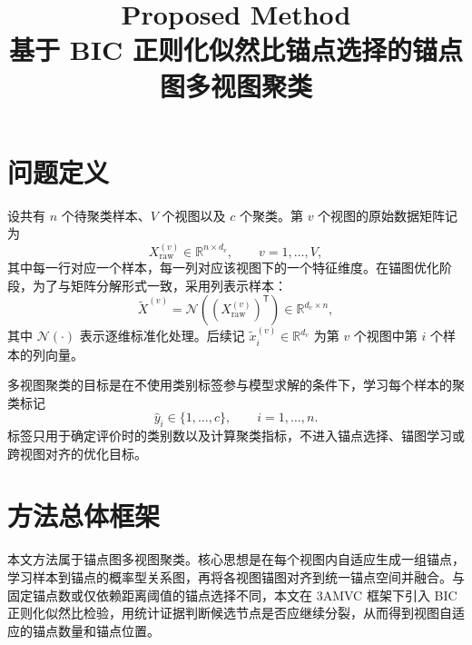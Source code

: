 \documentclass[UTF8,a4paper,12pt,fontset=none]{ctexart}
\title{\textbf{Proposed Method}\\
\large 基于 BIC 正则化似然比锚点选择的锚点图多视图聚类}
\author{}
\date{}
\newcommand{\R}{\mathbb{R}}
\newcommand{\T}{\mathsf{T}}
\begin{document}
\maketitle
\tableofcontents
\newpage

\section{问题定义}

设共有 \(n\) 个待聚类样本、\(V\) 个视图以及 \(c\) 个聚类。第 \(v\) 个视图的原始数据矩阵记为
\begin{equation}
X_{\mathrm{raw}}^{(v)}\in\R^{n\times d_v},\qquad v=1,\ldots,V,
\end{equation}
其中每一行对应一个样本，每一列对应该视图下的一个特征维度。在锚图优化阶段，为了与矩阵分解形式一致，采用列表示样本：
\begin{equation}
\widetilde X^{(v)}
=\mathcal{N}\!\left((X_{\mathrm{raw}}^{(v)})^\T\right)
\in\R^{d_v\times n},
\end{equation}
其中 \(\mathcal{N}(\cdot)\) 表示逐维标准化处理。后续记
\(\widetilde x_i^{(v)}\in\R^{d_v}\) 为第 \(v\) 个视图中第 \(i\) 个样本的列向量。

多视图聚类的目标是在不使用类别标签参与模型求解的条件下，学习每个样本的聚类标记
\begin{equation}
\hat y_i\in\{1,\ldots,c\},\qquad i=1,\ldots,n .
\end{equation}
标签只用于确定评价时的类别数以及计算聚类指标，不进入锚点选择、锚图学习或跨视图对齐的优化目标。

\section{方法总体框架}

本文方法属于锚点图多视图聚类。核心思想是在每个视图内自适应生成一组锚点，学习样本到锚点的概率型关系图，再将各视图锚图对齐到统一锚点空间并融合。与固定锚点数或仅依赖距离阈值的锚点选择不同，本文在 3AMVC 框架下引入 BIC 正则化似然比检验，用统计证据判断候选节点是否应继续分裂，从而得到视图自适应的锚点数量和锚点位置。
\end{document}
